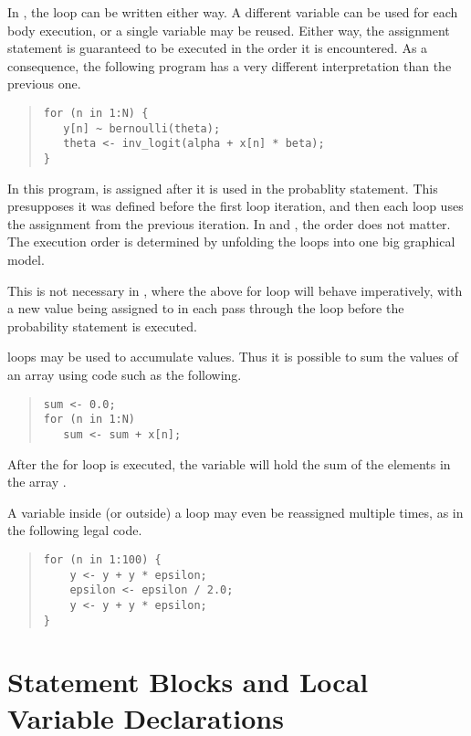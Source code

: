 In \Stan, the loop can be written either way.  A different variable
 can be used for each body execution, or a single
variable  may be reused. Either way, the assignment
statement is guaranteed to be executed in the order it is encountered.
As a consequence, the following \Stan program has a very different
interpretation than the previous one.
%
\begin{quote}
\begin{Verbatim}
for (n in 1:N) {
   y[n] ~ bernoulli(theta);
   theta <- inv_logit(alpha + x[n] * beta);
}
\end{Verbatim}
\end{quote}
%
In this program,  is assigned after it is used in the
probablity statement.  This presupposes it was defined before the
first loop iteration, and then each loop uses the assignment from the
previous iteration.  In \BUGS and \JAGS, the order does not matter.
The execution order is determined by unfolding the loops into one big
graphical model.

This is not necessary in \Stan, where the above for loop will behave
imperatively, with a new value being assigned to  in each
pass through the loop before the probability statement is executed.

\Stan loops may be used to accumulate values.  Thus it is possible to
sum the values of an array using code such as the following.
%
\begin{quote}
\begin{Verbatim}
sum <- 0.0;
for (n in 1:N) 
   sum <- sum + x[n];
\end{Verbatim}
\end{quote}
%
After the for loop is executed, the variable  will hold the
sum of the elements in the array .

A variable inside (or outside) a loop may even be reassigned multiple
times, as in the following legal code.
%
\begin{quote}
\begin{Verbatim}
for (n in 1:100) {
    y <- y + y * epsilon;
    epsilon <- epsilon / 2.0;
    y <- y + y * epsilon;
}
\end{Verbatim}
\end{quote}
%


\section{Statement Blocks and Local Variable Declarations}

